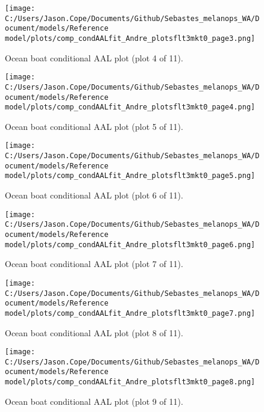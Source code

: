 \documentclass[11pt,
  english,
  letterpaper,
]{article}
\begin{document}
\begin{figure}
\centering
\texttt{[image: C:/Users/Jason.Cope/Documents/Github/Sebastes\_melanops\_WA/Document/models/Reference model/plots/comp\_condAALfit\_Andre\_plotsflt3mkt0\_page3.png]}
\caption{Ocean boat conditional AAL plot (plot 4 of 11).\label{fig:comp_condAALfit_Andre_plotsflt3mkt0_page3}}
\end{figure}

\begin{figure}
\centering
\texttt{[image: C:/Users/Jason.Cope/Documents/Github/Sebastes\_melanops\_WA/Document/models/Reference model/plots/comp\_condAALfit\_Andre\_plotsflt3mkt0\_page4.png]}
\caption{Ocean boat conditional AAL plot (plot 5 of 11).\label{fig:comp_condAALfit_Andre_plotsflt3mkt0_page4}}
\end{figure}

\begin{figure}
\centering
\texttt{[image: C:/Users/Jason.Cope/Documents/Github/Sebastes\_melanops\_WA/Document/models/Reference model/plots/comp\_condAALfit\_Andre\_plotsflt3mkt0\_page5.png]}
\caption{Ocean boat conditional AAL plot (plot 6 of 11).\label{fig:comp_condAALfit_Andre_plotsflt3mkt0_page5}}
\end{figure}

\begin{figure}
\centering
\texttt{[image: C:/Users/Jason.Cope/Documents/Github/Sebastes\_melanops\_WA/Document/models/Reference model/plots/comp\_condAALfit\_Andre\_plotsflt3mkt0\_page6.png]}
\caption{Ocean boat conditional AAL plot (plot 7 of 11).\label{fig:comp_condAALfit_Andre_plotsflt3mkt0_page6}}
\end{figure}

\begin{figure}
\centering
\texttt{[image: C:/Users/Jason.Cope/Documents/Github/Sebastes\_melanops\_WA/Document/models/Reference model/plots/comp\_condAALfit\_Andre\_plotsflt3mkt0\_page7.png]}
\caption{Ocean boat conditional AAL plot (plot 8 of 11).\label{fig:comp_condAALfit_Andre_plotsflt3mkt0_page7}}
\end{figure}

\begin{figure}
\centering
\texttt{[image: C:/Users/Jason.Cope/Documents/Github/Sebastes\_melanops\_WA/Document/models/Reference model/plots/comp\_condAALfit\_Andre\_plotsflt3mkt0\_page8.png]}
\caption{Ocean boat conditional AAL plot (plot 9 of 11).\label{fig:comp_condAALfit_Andre_plotsflt3mkt0_page8}}
\end{figure}
\end{document}
